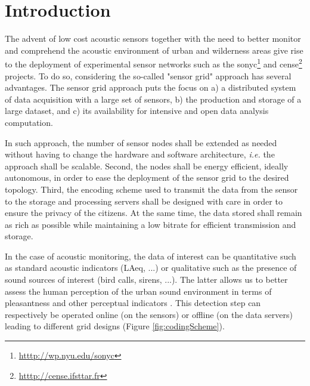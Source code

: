 \documentclass[sensors,article,submit,moreauthors,pdftex,10pt,a4paper]{mdpi}
\begin{document}


\section{Introduction}

The advent of low cost acoustic sensors together with the need to better monitor and comprehend the acoustic environment of urban and wilderness areas give rise to the deployment of experimental sensor networks such as the sonyc\footnote{\url{htttp://wp.nyu.edu/sonyc}} \cite{mydlarz2017implementation} and cense\footnote{\url{htttp://cense.ifsttar.fr}} \cite{picault2017} projects. To do so, considering the so-called "sensor grid" approach  \cite{lim2005sensor,tham2005sensorgrid} has several advantages. The sensor grid approach puts the focus on a) a distributed system of data acquisition with a large set of sensors, b) the production and storage of a large dataset, and c) its availability for intensive and open data analysis computation.

In such approach,  the number of sensor nodes shall be extended as needed without having to change the hardware and software architecture, \textit{i.e.} the approach shall be scalable. Second, the nodes shall be energy efficient, ideally autonomous, in order to ease the deployment of the sensor grid to the desired topology. Third, the encoding scheme used to transmit the data from the sensor to the storage and processing servers shall be designed with care in order to ensure the privacy of the citizens. At the same time, the data stored shall remain as rich as possible while maintaining a low bitrate for efficient transmission and storage.

In the case of acoustic monitoring, the data of interest can be quantitative such as standard acoustic indicators (LAeq, ...) or qualitative such as the presence of sound sources of interest (bird calls, sirens, ...). The latter allows us to better assess the human perception of the urban sound environment in terms of pleasantness and other perceptual indicators \cite{lavandier2006contribution, aumond2017modeling}. This detection step can respectively be operated online (on the sensors) or offline (on the data servers) leading to different grid designs (Figure \ref{fig:codingScheme}).
\end{document}
